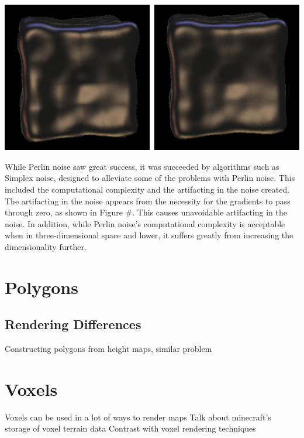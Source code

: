 \documentclass[10pt]{report}
\begin{document}
		\begin{minipage}{\textwidth}
			\centering
			\includegraphics[scale=.5]{s-curve}
			\label{fig:fig28}
		\end{minipage} 
		
		While Perlin noise saw great success, it was succeeded by algorithms such as Simplex noise, designed to alleviate some of the problems with Perlin noise. This included the computational complexity and the artifacting in the noise created. The artifacting in the noise appears from the necessity for the gradients to pass through zero, as shown in Figure \#. This causes unavoidable artifacting in the noise. In addition, while Perlin noise's computational complexity is acceptable when in three-dimensional space and lower, it suffers greatly from increasing the dimensionality further.
		

	\vspace{10pt}
	\let\clearpage\relax	
	\chapter{Polygons}
	
		\section{Rendering Differences}
		
		Constructing polygons from height maps, similar problem
	
	\vspace{10pt}
	\let\clearpage\relax
	\chapter{Voxels}
	
		Voxels can be used in a lot of ways to render maps 
		Talk about minecraft's storage of voxel terrain data
		Contrast with voxel rendering techniques
	
\end{document}

